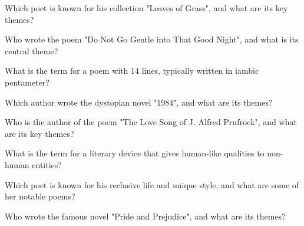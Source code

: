 \documentclass[12pt,a4paper]{book}
\begin{document}
\begin{enhancedmcq}[Question 18]{Which poet is known for his collection "Leaves of Grass", and what are its key themes?}
\end{enhancedmcq}

\begin{enhancedmcq}[Question 19]{Who wrote the poem "Do Not Go Gentle into That Good Night", and what is its central theme?}
\end{enhancedmcq}

\begin{enhancedmcq}[Question 20]{What is the term for a poem with 14 lines, typically written in iambic pentameter?}
\end{enhancedmcq}

\begin{enhancedmcq}[Question 21]{Which author wrote the dystopian novel "1984", and what are its themes?}
\end{enhancedmcq}

\begin{enhancedmcq}[Question 22]{Who is the author of the poem "The Love Song of J. Alfred Prufrock", and what are its key themes?}
\end{enhancedmcq}

\begin{enhancedmcq}[Question 23]{What is the term for a literary device that gives human-like qualities to non-human entities?}
\end{enhancedmcq}

\begin{enhancedmcq}[Question 24]{Which poet is known for his reclusive life and unique style, and what are some of her notable poems?}
\end{enhancedmcq}

\begin{enhancedmcq}[Question 25]{Who wrote the famous novel "Pride and Prejudice", and what are its themes?}
\end{enhancedmcq}
\end{document}
